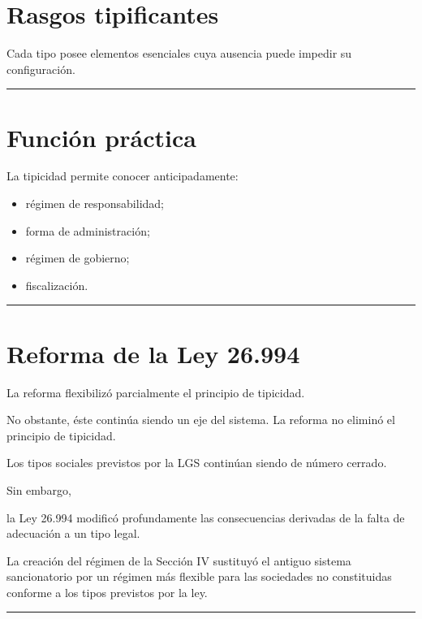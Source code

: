\documentclass[
  spanish,
  letterpaper,
  DIV=11,
  numbers=noendperiod]{scrartcl}
\providecommand{\tightlist}{%
  \setlength{\itemsep}{0pt}\setlength{\parskip}{0pt}}
\begin{document}
\section{Rasgos tipificantes}\label{rasgos-tipificantes}

Cada tipo posee elementos esenciales cuya ausencia puede impedir su
configuración.

\begin{center}\rule{0.5\linewidth}{0.5pt}\end{center}

\section{Función práctica}\label{funciuxf3n-pruxe1ctica}

La tipicidad permite conocer anticipadamente:

\begin{itemize}
\tightlist
\item
  régimen de responsabilidad;
\item
  forma de administración;
\item
  régimen de gobierno;
\item
  fiscalización.
\end{itemize}

\begin{center}\rule{0.5\linewidth}{0.5pt}\end{center}

\section{Reforma de la Ley 26.994}\label{reforma-de-la-ley-26.994-1}

La reforma flexibilizó parcialmente el principio de tipicidad.

No obstante, éste continúa siendo un eje del sistema. La reforma no
eliminó el principio de tipicidad.

Los tipos sociales previstos por la LGS continúan siendo de número
cerrado.

Sin embargo,

la Ley 26.994 modificó profundamente las consecuencias derivadas de la
falta de adecuación a un tipo legal.

La creación del régimen de la Sección IV sustituyó el antiguo sistema
sancionatorio por un régimen más flexible para las sociedades no
constituidas conforme a los tipos previstos por la ley.

\begin{center}\rule{0.5\linewidth}{0.5pt}\end{center}
\end{document}
